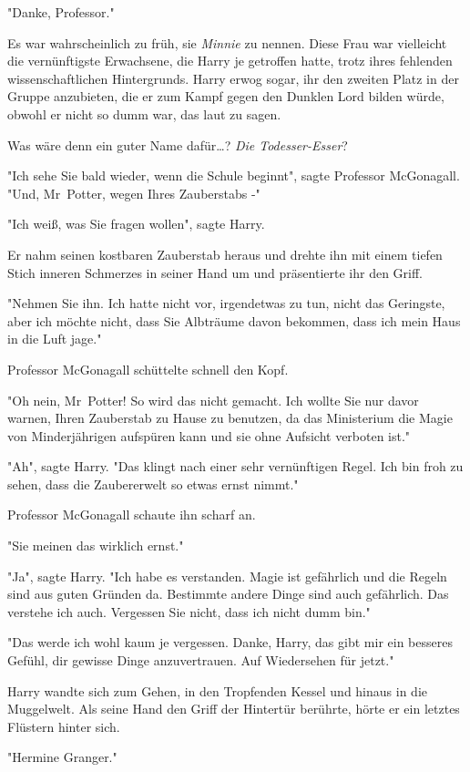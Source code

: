 {"Danke, Professor."

Es war wahrscheinlich zu früh, sie \emph{Minnie} zu nennen. Diese Frau war vielleicht die vernünftigste Erwachsene, die Harry je getroffen hatte, trotz ihres fehlenden wissenschaftlichen Hintergrunds. Harry erwog sogar, ihr den zweiten Platz in der Gruppe anzubieten, die er zum Kampf gegen den Dunklen Lord bilden würde, obwohl er nicht so dumm war, das laut zu sagen.

Was wäre denn ein guter Name dafür…? \emph{Die Todesser-Esser}?

"Ich sehe Sie bald wieder, wenn die Schule beginnt", sagte Professor McGonagall. "Und, Mr~Potter, wegen Ihres Zauberstabs -"

"Ich weiß, was Sie fragen wollen", sagte Harry.

Er nahm seinen kostbaren Zauberstab heraus und drehte ihn mit einem tiefen Stich inneren Schmerzes in seiner Hand um und präsentierte ihr den Griff.

"Nehmen Sie ihn. Ich hatte nicht vor, irgendetwas zu tun, nicht das Geringste, aber ich möchte nicht, dass Sie Albträume davon bekommen, dass ich mein Haus in die Luft jage."

Professor McGonagall schüttelte schnell den Kopf.

"Oh nein, Mr~Potter! So wird das nicht gemacht. Ich wollte Sie nur davor warnen, Ihren Zauberstab zu Hause zu benutzen, da das Ministerium die Magie von Minderjährigen aufspüren kann und sie ohne Aufsicht verboten ist."

"Ah", sagte Harry. "Das klingt nach einer sehr vernünftigen Regel. Ich bin froh zu sehen, dass die Zaubererwelt so etwas ernst nimmt."

Professor McGonagall schaute ihn scharf an.

"Sie meinen das wirklich ernst."

"Ja", sagte Harry. "Ich habe es verstanden. Magie ist gefährlich und die Regeln sind aus guten Gründen da. Bestimmte andere Dinge sind auch gefährlich. Das verstehe ich auch. Vergessen Sie nicht, dass ich nicht dumm bin."

"Das werde ich wohl kaum je vergessen. Danke, Harry, das gibt mir ein besseres Gefühl, dir gewisse Dinge anzuvertrauen. Auf Wiedersehen für jetzt."

Harry wandte sich zum Gehen, in den Tropfenden Kessel und hinaus in die Muggelwelt. Als seine Hand den Griff der Hintertür berührte, hörte er ein letztes Flüstern hinter sich.

"Hermine Granger."

}
